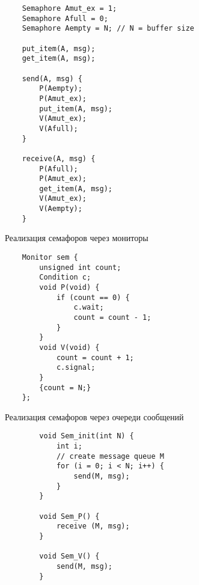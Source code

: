 \documentclass[12pt, a4paper]{article}
\begin{document}
    \begin{lstlisting}
    Semaphore Amut_ex = 1;
    Semaphore Afull = 0;
    Semaphore Aempty = N; // N = buffer size
    
    put_item(A, msg);
    get_item(A, msg);

    send(A, msg) {
        P(Aempty);
        P(Amut_ex);
        put_item(A, msg);
        V(Amut_ex);
        V(Afull);
    }

    receive(A, msg) {
        P(Afull);
        P(Amut_ex);
        get_item(A, msg);
        V(Amut_ex);
        V(Aempty);
    }
    \end{lstlisting}
    \newpage
    \begin{center}
        Реализация семафоров через мониторы
    \end{center}
    \begin{lstlisting}
    Monitor sem {
        unsigned int count;
        Condition c;
        void P(void) {
            if (count == 0) {
                c.wait;
                count = count - 1;
            }
        }
        void V(void) {
            count = count + 1;
            c.signal;
        }
        {count = N;}
    };
    \end{lstlisting}
    \newpage
    \begin{center}
        Реализация семафоров через очереди сообщений
    \end{center}
    \begin{lstlisting}
        void Sem_init(int N) {
            int i;
            // create message queue M
            for (i = 0; i < N; i++) {
                send(M, msg);
            }
        }

        void Sem_P() {
            receive (M, msg);
        }

        void Sem_V() {
            send(M, msg);
        }
    \end{lstlisting}
\end{document}
